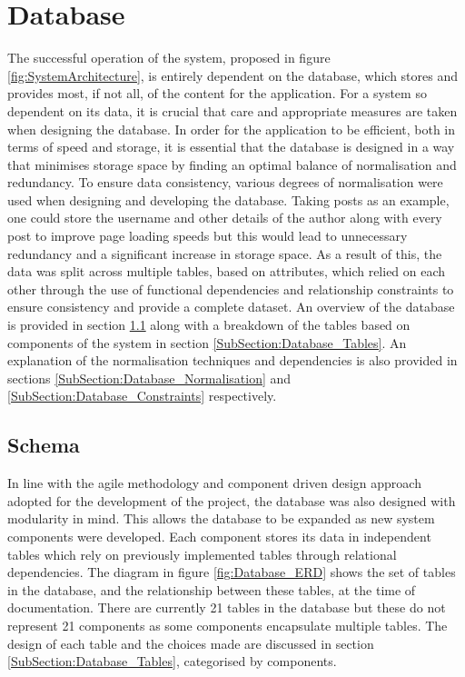 \section{Database}
The successful operation of the system, proposed in figure \ref{fig:SystemArchitecture}, is entirely dependent on the database, which stores and provides most, if not all, of the content for the application. For a system so dependent on its data, it is crucial that care and appropriate measures are taken when designing the database. In order for the application to be efficient, both in terms of speed and storage, it is essential that the database is designed in a way that minimises storage space by finding an optimal balance of normalisation and redundancy. To ensure data consistency, various degrees of normalisation were used when designing and developing the database. Taking posts as an example, one could store the username and other details of the author along with every post to improve page loading speeds but this would lead to unnecessary redundancy and a significant increase in storage space. As a result of this, the data was split across multiple tables, based on attributes, which relied on each other through the use of functional dependencies and relationship constraints to ensure consistency and provide a complete dataset. An overview of the database is provided in section \ref{SubSection:Database_Schema} along with a breakdown of the tables based on components of the system in section \ref{SubSection:Database_Tables}. An explanation of the normalisation techniques and dependencies is also provided in sections \ref{SubSection:Database_Normalisation} and \ref{SubSection:Database_Constraints} respectively.

\subsection{Schema}
\label{SubSection:Database_Schema}
In line with the agile methodology and component driven design approach adopted for the development of the project, the database was also designed with modularity in mind. This allows the database to be expanded as new system components were developed. Each component stores its data in independent tables which rely on previously implemented tables through relational dependencies. The diagram in figure \ref{fig:Database_ERD} shows the set of tables in the database, and the relationship between these tables, at the time of documentation. There are currently 21 tables in the database but these do not represent 21 components as some components encapsulate multiple tables. The design of each table and the choices made are discussed in section \ref{SubSection:Database_Tables}, categorised by components.

